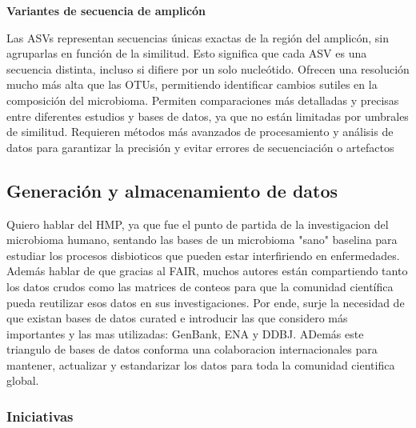 \textbf{Variantes de secuencia de amplicón}

Las ASVs representan secuencias únicas exactas de la región del amplicón, sin agruparlas en función de la similitud. Esto significa que cada ASV es una secuencia distinta, incluso si difiere por un solo nucleótido. Ofrecen una resolución mucho más alta que las OTUs, permitiendo identificar cambios sutiles en la composición del microbioma. Permiten comparaciones más detalladas y precisas entre diferentes estudios y bases de datos, ya que no están limitadas por umbrales de similitud. Requieren métodos más avanzados de procesamiento y análisis de datos para garantizar la precisión y evitar errores de secuenciación o artefactos \cite{callahan2016dada2, callahan2017exact}


\subsection{Generación y almacenamiento de datos}

Quiero hablar del HMP, ya que fue el punto de partida de la investigacion del microbioma humano, sentando las bases de un microbioma "sano" baselina para estudiar los procesos disbioticos que pueden estar interfiriendo en enfermedades.  Además hablar de que gracias al FAIR, muchos autores están compartiendo tanto los datos crudos como las matrices de conteos para que la comunidad científica pueda reutilizar esos datos en sus investigaciones. Por ende, surje la necesidad de que existan bases de datos curated e introducir las que considero más importantes y las mas utilizadas: GenBank, ENA y DDBJ. ADemás este triangulo de bases de datos conforma una colaboracion internacionales para mantener, actualizar y estandarizar los datos para toda la comunidad cientifica global.

\subsubsection{Iniciativas}

